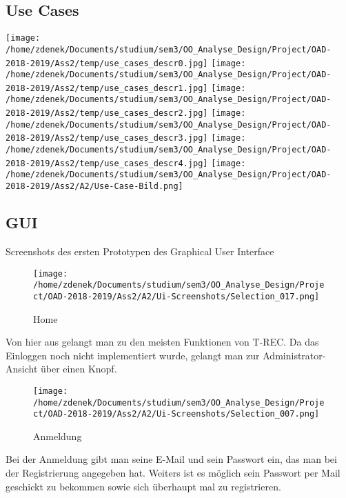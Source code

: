 \documentclass[a4paper]{article}
\begin{document}
\subsection{Use Cases}



\texttt{[image: /home/zdenek/Documents/studium/sem3/OO\_Analyse\_Design/Project/OAD-2018-2019/Ass2/temp/use\_cases\_descr0.jpg]}
\newpage
\texttt{[image: /home/zdenek/Documents/studium/sem3/OO\_Analyse\_Design/Project/OAD-2018-2019/Ass2/temp/use\_cases\_descr1.jpg]}
\newpage
\texttt{[image: /home/zdenek/Documents/studium/sem3/OO\_Analyse\_Design/Project/OAD-2018-2019/Ass2/temp/use\_cases\_descr2.jpg]}
\newpage
\texttt{[image: /home/zdenek/Documents/studium/sem3/OO\_Analyse\_Design/Project/OAD-2018-2019/Ass2/temp/use\_cases\_descr3.jpg]}
\newpage
\texttt{[image: /home/zdenek/Documents/studium/sem3/OO\_Analyse\_Design/Project/OAD-2018-2019/Ass2/temp/use\_cases\_descr4.jpg]}
\newpage
\texttt{[image: /home/zdenek/Documents/studium/sem3/OO\_Analyse\_Design/Project/OAD-2018-2019/Ass2/A2/Use-Case-Bild.png]}

\newpage

\subsection{GUI}

Screenshots des ersten Prototypen des Graphical User Interface

\begin{figure}[h]
\centering
\caption{Home}
\texttt{[image: /home/zdenek/Documents/studium/sem3/OO\_Analyse\_Design/Project/OAD-2018-2019/Ass2/A2/Ui-Screenshots/Selection\_017.png]}
\end{figure}

Von hier aus gelangt man zu den meisten Funktionen von T-REC.
Da das Einloggen noch nicht implementiert wurde, gelangt man zur Administrator-Ansicht über einen Knopf.


\begin{figure}[h]
\centering
\caption{Anmeldung}
\texttt{[image: /home/zdenek/Documents/studium/sem3/OO\_Analyse\_Design/Project/OAD-2018-2019/Ass2/A2/Ui-Screenshots/Selection\_007.png]}
\end{figure}

Bei der Anmeldung gibt man seine E-Mail und sein Passwort ein, das man bei der Registrierung angegeben hat. Weiters ist es möglich sein Passwort per Mail geschickt zu bekommen sowie sich überhaupt mal zu registrieren.
\end{document}
